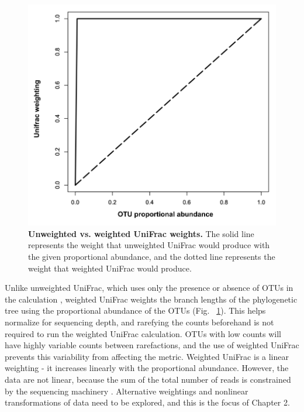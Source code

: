 \begin{figure}[h]
\includegraphics[scale=0.5]{weights.png}
\caption[Unweighted vs. weighted UniFrac weights.]{{\bf Unweighted vs. weighted UniFrac weights.}
The solid line represents the weight that unweighted UniFrac would produce with the given proportional abundance, and the dotted line represents the weight that weighted UniFrac would produce.}
\label{figure_weights}
\end{figure}

Unlike unweighted UniFrac, which uses only the presence or absence of OTUs in the calculation \cite{lozupone2005unifrac}, weighted UniFrac weights the branch lengths of the phylogenetic tree using the proportional abundance of the OTUs \cite{lozupone2007quantitative} (Fig. ~\ref{figure_weights}). This helps normalize for sequencing depth, and rarefying the counts beforehand is not required to run the weighted UniFrac calculation. OTUs with low counts will have highly variable counts between rarefactions, and the use of weighted UniFrac prevents this variability from affecting the metric. Weighted UniFrac is a linear weighting - it increases linearly with the proportional abundance. However, the data are not linear, because the sum of the total number of reads is constrained by the sequencing machinery \cite{friedman2012inferring}. Alternative weightings and nonlinear transformations of data need to be explored, and this is the focus of Chapter 2.

